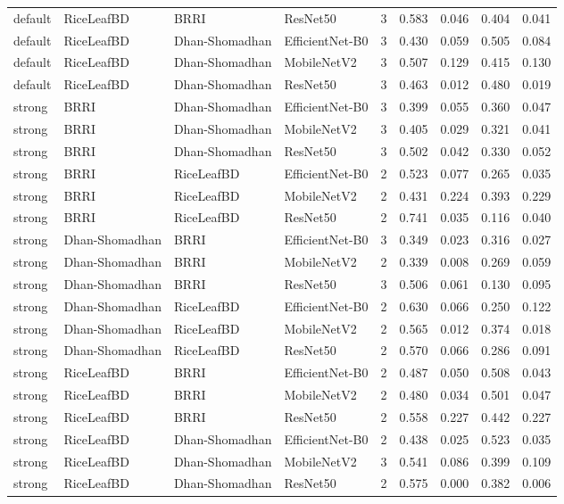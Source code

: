 \begin{tabular}{llllrrrrr}
default & RiceLeafBD & BRRI & ResNet50 & 3 & 0.583 & 0.046 & 0.404 & 0.041 \\
default & RiceLeafBD & Dhan-Shomadhan & EfficientNet-B0 & 3 & 0.430 & 0.059 & 0.505 & 0.084 \\
default & RiceLeafBD & Dhan-Shomadhan & MobileNetV2 & 3 & 0.507 & 0.129 & 0.415 & 0.130 \\
default & RiceLeafBD & Dhan-Shomadhan & ResNet50 & 3 & 0.463 & 0.012 & 0.480 & 0.019 \\
strong & BRRI & Dhan-Shomadhan & EfficientNet-B0 & 3 & 0.399 & 0.055 & 0.360 & 0.047 \\
strong & BRRI & Dhan-Shomadhan & MobileNetV2 & 3 & 0.405 & 0.029 & 0.321 & 0.041 \\
strong & BRRI & Dhan-Shomadhan & ResNet50 & 3 & 0.502 & 0.042 & 0.330 & 0.052 \\
strong & BRRI & RiceLeafBD & EfficientNet-B0 & 2 & 0.523 & 0.077 & 0.265 & 0.035 \\
strong & BRRI & RiceLeafBD & MobileNetV2 & 2 & 0.431 & 0.224 & 0.393 & 0.229 \\
strong & BRRI & RiceLeafBD & ResNet50 & 2 & 0.741 & 0.035 & 0.116 & 0.040 \\
strong & Dhan-Shomadhan & BRRI & EfficientNet-B0 & 3 & 0.349 & 0.023 & 0.316 & 0.027 \\
strong & Dhan-Shomadhan & BRRI & MobileNetV2 & 2 & 0.339 & 0.008 & 0.269 & 0.059 \\
strong & Dhan-Shomadhan & BRRI & ResNet50 & 3 & 0.506 & 0.061 & 0.130 & 0.095 \\
strong & Dhan-Shomadhan & RiceLeafBD & EfficientNet-B0 & 2 & 0.630 & 0.066 & 0.250 & 0.122 \\
strong & Dhan-Shomadhan & RiceLeafBD & MobileNetV2 & 2 & 0.565 & 0.012 & 0.374 & 0.018 \\
strong & Dhan-Shomadhan & RiceLeafBD & ResNet50 & 2 & 0.570 & 0.066 & 0.286 & 0.091 \\
strong & RiceLeafBD & BRRI & EfficientNet-B0 & 2 & 0.487 & 0.050 & 0.508 & 0.043 \\
strong & RiceLeafBD & BRRI & MobileNetV2 & 2 & 0.480 & 0.034 & 0.501 & 0.047 \\
strong & RiceLeafBD & BRRI & ResNet50 & 2 & 0.558 & 0.227 & 0.442 & 0.227 \\
strong & RiceLeafBD & Dhan-Shomadhan & EfficientNet-B0 & 2 & 0.438 & 0.025 & 0.523 & 0.035 \\
strong & RiceLeafBD & Dhan-Shomadhan & MobileNetV2 & 3 & 0.541 & 0.086 & 0.399 & 0.109 \\
strong & RiceLeafBD & Dhan-Shomadhan & ResNet50 & 2 & 0.575 & 0.000 & 0.382 & 0.006 \\
\bottomrule
\end{tabular}

